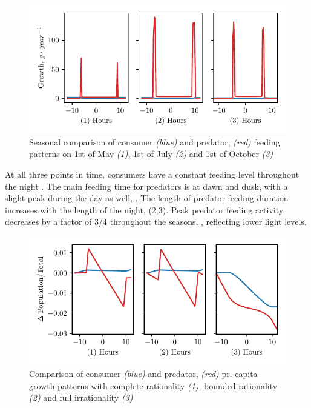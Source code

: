 \begin{figure}[H]
\includegraphics{plots/growth_short_rational.pdf}
\caption{Seasonal comparison of consumer \emph{(blue)} and predator, \emph{(red)} feeding patterns on 1st of May \emph{(1)}, 1st of July \emph{(2)} and 1st of October \emph{(3)}}
\label{fig:growth_short_rational}
\end{figure}
At all three points in time, consumers have a constant feeding level throughout the night . The main feeding time for predators is at dawn and dusk, with a slight peak during the day as well, . The length of predator feeding duration increases with the length of the night,  (2,3). Peak predator feeding activity decreases by a factor of 3/4 throughout the seasons, , reflecting lower light levels.
\begin{figure}[H]
  \begin{centering}
\includegraphics{plots/pop_dyn_comp_full_semi_none.pdf}
\end{centering}
\caption{Comparison of consumer \emph{(blue)} and predator, \emph{(red)} pr. capita growth patterns with complete rationality \emph{(1)}, bounded rationality \emph{(2)} and full irrationality \emph{(3)}}
\label{fig:pop_short_term}
\end{figure}
